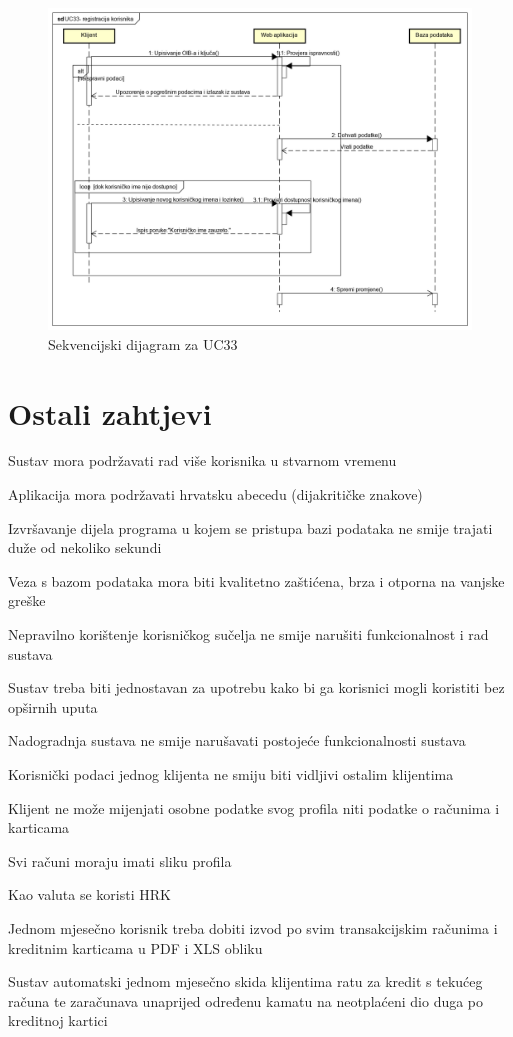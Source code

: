 			\begin{figure}[H]
				\includegraphics[scale=0.50]{slike/UC33- registracija korisnika.PNG}
				\centering
				\caption{Sekvencijski dijagram za UC33}
				\label{fig:uc33}
			\end{figure}
			\eject
			
	
		\section{Ostali zahtjevi}
			 
			 \begin{packed_item}
			 	\item Sustav mora podržavati rad više korisnika u stvarnom vremenu
			 	\item Aplikacija mora podržavati hrvatsku abecedu (dijakritičke znakove)
			 	\item Izvršavanje dijela programa u kojem se pristupa bazi podataka ne smije trajati duže od nekoliko sekundi 
			 	\item Veza s bazom podataka mora biti kvalitetno zaštićena, brza i otporna na vanjske greške
			 	\item Nepravilno korištenje korisničkog sučelja ne smije narušiti funkcionalnost i rad sustava	
			 	\item Sustav treba biti jednostavan za upotrebu kako bi ga korisnici mogli koristiti bez opširnih uputa
			 	\item Nadogradnja sustava ne smije narušavati postojeće funkcionalnosti sustava
			 	\item Korisnički podaci jednog klijenta ne smiju biti vidljivi ostalim klijentima
			 	\item Klijent ne može mijenjati osobne podatke svog profila niti podatke o računima i karticama
			 	\item Svi računi moraju imati sliku profila
			 	\item Kao valuta se koristi HRK
			 	\item Jednom mjesečno korisnik treba dobiti izvod po svim transakcijskim
			 	računima i kreditnim karticama u PDF i XLS obliku
			 	\item Sustav automatski jednom mjesečno skida klijentima ratu za kredit s tekućeg računa te zaračunava unaprijed određenu kamatu na neotplaćeni dio duga po kreditnoj kartici
			 \end{packed_item}
